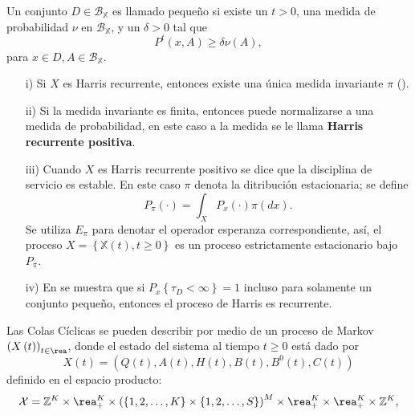 \begin{Def}
Un conjunto $D\in\mathcal{B}_\mathbb{X}$ es llamado peque\~no si
existe un $t>0$, una medida de probabilidad $\nu$ en
$\mathcal{B}_\mathbb{X}$, y un $\delta>0$ tal que
\[P^{t}\left(x,A\right)\geq\delta\nu\left(A\right),\] para $x\in
D,A\in\mathcal{B}_\mathbb{X}$.
\end{Def}
\begin{Note}
\begin{itemize}

\item[i)] Si $X$ es Harris recurrente, entonces existe una \'unica medida
invariante $\pi$ (\cite{Getoor}).

\item[ii)] Si la medida invariante es finita, entonces puede
normalizarse a una medida de probabilidad, en este caso a la
medida se le llama \textbf{Harris recurrente positiva}.

\item[iii)] Cuando $X$ es Harris recurrente positivo se dice que
la disciplina de servicio es estable. En este caso $\pi$ denota la
ditribuci\'on estacionaria; se define
\[P_{\pi}\left(\cdot\right)=\int_{X}P_{x}\left(\cdot\right)\pi\left(dx\right).\]
Se utiliza $E_{\pi}$ para denotar el operador esperanza
correspondiente, as\'i, el proceso
$X=\left\{\mathbb{X}\left(t\right),t\geq0\right\}$ es un proceso
estrictamente estacionario bajo $P_{\pi}$.

\item[iv)] En \cite{MeynTweedie} se muestra que si
$P_{x}\left\{\tau_{D}<\infty\right\}=1$ incluso para solamente un
conjunto peque\~no, entonces el proceso de Harris es recurrente.
\end{itemize}
\end{Note}


Las Colas C\'iclicas se pueden describir por medio de un proceso
de Markov $\left(X\left(t\right)\right)_{t\in\rea}$, donde el
estado del sistema al tiempo $t\geq0$ est\'a dado por
\begin{equation}
X\left(t\right)=\left(Q\left(t\right),A\left(t\right),H\left(t\right),B\left(t\right),B^{0}\left(t\right),C\left(t\right)\right)
\end{equation}
definido en el espacio producto:
\begin{equation}
\mathcal{X}=\mathbb{Z}^{K}\times\rea_{+}^{K}\times\left(\left\{1,2,\ldots,K\right\}\times\left\{1,2,\ldots,S\right\}\right)^{M}\times\rea_{+}^{K}\times\rea_{+}^{K}\times\mathbb{Z}^{K},
\end{equation}

